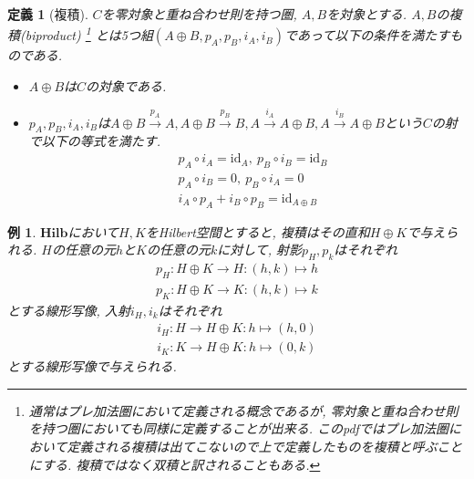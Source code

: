 \documentclass[a4paper,12pt]{ltjsarticle}
\theoremstyle{break}
\newtheorem{defn}[thm]{定義}
\newtheorem{eg}[thm]{例}
\newcommand{\hilb}{\mathbf{Hilb}}
\newcommand{\xr}[1]{\xrightarrow{#1}}
\newcommand{\id}{\mathrm{id}}
\newcommand{\ci}{\circ}
\newcommand{\mt}{\mapsto}
\newcommand{\opl}{\oplus}
\numberwithin{equation}{section}
\begin{document}
\begin{defn}[複積]
  $C$を零対象と重ね合わせ則を持つ圏, $A,B$を対象とする. 
  $A,B$の複積(biproduct)
  \footnote{
    通常はプレ加法圏において定義される概念であるが, 零対象と重ね合わせ則を持つ圏においても同様に定義することが出来る.
    このpdfではプレ加法圏において定義される複積は出てこないので上で定義したものを複積と呼ぶことにする.  
    複積ではなく双積と訳されることもある. 
  }
  とは5つ組$(A \opl B, p_A,p_B,i_A,i_B)$であって以下の条件を満たすものである. 
  \begin{itemize}
    \item $A \opl B$は$C$の対象である. 
    \item $p_A,p_B,i_A,i_B$は$A \opl B \xr{p_A} A, A \opl B \xr{p_B} B, A \xr{i_A} A \opl B, A \xr{i_B} A \opl B$という$C$の射で以下の等式を満たす. 
    \begin{align*}
      &p_A \ci i_A = \id_A, ~ p_B \ci i_B = \id_B \\
      &p_A \ci i_B = 0, ~ p_B \ci i_A = 0 \\
      &i_A \ci p_A + i_B \ci p_B = \id_{A \opl B} 
    \end{align*}
  \end{itemize}
\end{defn}

\begin{eg}
  $\hilb$において$H,K$をHilbert空間とすると, 複積はその直和$H \opl K$で与えられる. 
  $H$の任意の元$h$と$K$の任意の元$k$に対して, 
  射影$p_H, p_k$はそれぞれ
  \begin{align*}
    p_H: H \opl K \to H: (h,k) \mapsto h \\
    p_K: H \opl K \to K: (h,k) \mapsto k
  \end{align*}
  とする線形写像, 入射$i_H, i_k$はそれぞれ
  \begin{align*}
    i_H: H \to H \opl K: h \mt (h,0) \\
    i_K: K \to H \opl K: h \mt (0,k)
  \end{align*} 
  とする線形写像で与えられる. 
\end{eg}
\end{document}
